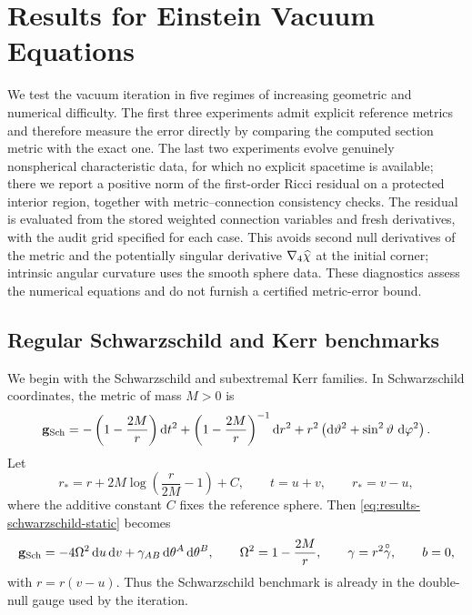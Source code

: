 \section{Results for Einstein Vacuum Equations}

We test the vacuum iteration in five regimes of increasing geometric and
numerical difficulty.  The first three experiments admit explicit reference
metrics and therefore measure the error directly by comparing the computed
section metric with the exact one.  The last two experiments evolve genuinely
nonspherical characteristic data, for which no explicit spacetime is
available; there we report a positive norm of the first-order Ricci residual
on a protected interior region, together with metric--connection consistency
checks.  The residual is evaluated from the stored weighted connection
variables and fresh derivatives, with the audit grid specified for each case.  This avoids
second null derivatives of the metric and the potentially singular derivative
$\nabla_4\widehat\chi$ at the initial corner; intrinsic angular curvature uses the
smooth sphere data.  These diagnostics assess the numerical equations and do
not furnish a certified metric-error bound.

\subsection{Regular Schwarzschild and Kerr benchmarks}

We begin with the Schwarzschild and subextremal Kerr families.  In
Schwarzschild coordinates, the metric of mass $M>0$ is
\begin{equation}\label{eq:results-schwarzschild-static}
  \mathbf g_{\mathrm{Sch}}
  =-\left(1-\frac{2M}{r}\right)\mathop{}\!\mathrm d t^2
   +\left(1-\frac{2M}{r}\right)^{-1}\mathop{}\!\mathrm d r^2
   +r^2\left(\mathop{}\!\mathrm d\vartheta^2+\sin^2\vartheta\,\mathop{}\!\mathrm d\varphi^2\right).
\end{equation}
Let
\begin{equation}
  r_*=r+2M\log\left(\frac{r}{2M}-1\right)+C,
  \qquad t=u+v,\qquad r_*=v-u,
\end{equation}
where the additive constant $C$ fixes the reference sphere.  Then
\eqref{eq:results-schwarzschild-static} becomes
\begin{equation}\label{eq:results-schwarzschild-double-null}
  \mathbf g_{\mathrm{Sch}}
  =-4\Omega^2\mathop{}\!\mathrm d u\mathop{}\!\mathrm d v+\gamma_{AB}\mathop{}\!\mathrm d\theta^A\mathop{}\!\mathrm d\theta^B,
  \qquad
  \Omega^2=1-\frac{2M}{r},\qquad
  \gamma=r^2\overset{\circ}{\gamma},\qquad b=0,
\end{equation}
with $r=r(v-u)$.  Thus the Schwarzschild benchmark is already in the
double-null gauge used by the iteration.

